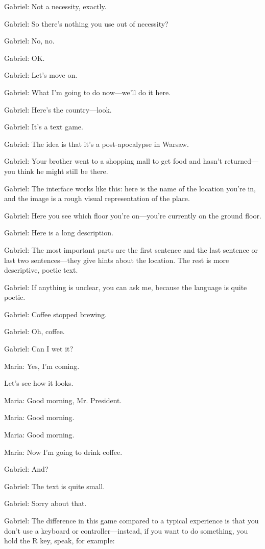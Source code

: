 Gabriel: Not a necessity, exactly.

Gabriel: So there’s nothing you use out of necessity?

Gabriel: No, no.

Gabriel: OK.

Gabriel: Let’s move on.

Gabriel: What I’m going to do now—we’ll do it here.

Gabriel: Here’s the country—look.

Gabriel: It’s a text game.

Gabriel: The idea is that it’s a post-apocalypse in Warsaw.

Gabriel: Your brother went to a shopping mall to get food and hasn’t returned—you think he might still be there.

Gabriel: The interface works like this: here is the name of the location you’re in, and the image is a rough visual representation of the place.

Gabriel: Here you see which floor you’re on—you’re currently on the ground floor.

Gabriel: Here is a long description.

Gabriel: The most important parts are the first sentence and the last sentence or last two sentences—they give hints about the location. The rest is more descriptive, poetic text.

Gabriel: If anything is unclear, you can ask me, because the language is quite poetic.

Gabriel: Coffee stopped brewing.

Gabriel: Oh, coffee.

Gabriel: Can I wet it?

Maria: Yes, I’m coming.

Let’s see how it looks.

Maria: Good morning, Mr. President.

Maria: Good morning.

Maria: Good morning.

Maria: Now I’m going to drink coffee.

Gabriel: And?

Gabriel: The text is quite small.

Gabriel: Sorry about that.

Gabriel: The difference in this game compared to a typical experience is that you don’t use a keyboard or controller—instead, if you want to do something, you hold the R key, speak, for example:

